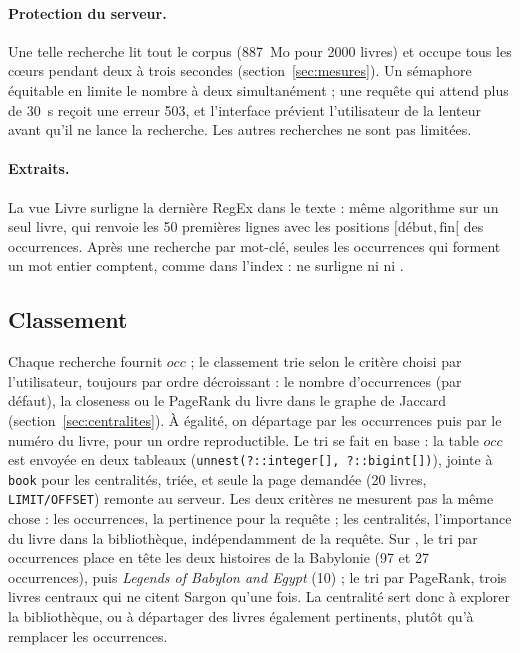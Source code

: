 \paragraph{Protection du serveur.} Une telle recherche lit tout le corpus
(887~Mo pour 2000 livres) et occupe tous les cœurs pendant deux à trois
secondes (section~\ref{sec:mesures}). Un sémaphore équitable en limite le
nombre à deux simultanément ; une requête qui attend plus de 30~s reçoit une
erreur 503, et l'interface prévient l'utilisateur de la lenteur avant qu'il ne
lance la recherche. Les autres recherches ne sont pas limitées.

\paragraph{Extraits.} La vue Livre surligne la dernière RegEx dans le texte :
même algorithme sur un seul livre, qui renvoie les 50 premières lignes avec les
positions $[\text{début}, \text{fin}[$ des occurrences. Après une recherche par
mot-clé, seules les occurrences qui forment un mot entier comptent, comme dans
l'index :  ne surligne ni  ni .

\subsection{Classement}
\label{sec:classement}

Chaque recherche fournit $\mathit{occ}$ ; le classement trie selon le critère
choisi par l'utilisateur, toujours par ordre décroissant : le nombre
d'occurrences (par défaut), la closeness ou le PageRank du livre dans le graphe
de Jaccard (section~\ref{sec:centralites}). À égalité, on départage par les
occurrences puis par le numéro du livre, pour un ordre reproductible. Le tri se
fait en base : la table $\mathit{occ}$ est envoyée en deux tableaux
(\texttt{unnest(?::integer[], ?::bigint[])}), jointe à \texttt{book} pour les
centralités, triée, et seule la page demandée (20 livres, \texttt{LIMIT/OFFSET})
remonte au serveur. Les deux critères ne mesurent pas la même chose : les
occurrences, la pertinence pour la requête ; les centralités, l'importance du
livre dans la bibliothèque, indépendamment de la requête. Sur , le
tri par occurrences place en tête les deux histoires de la Babylonie (97 et 27
occurrences), puis \emph{Legends of Babylon and Egypt} (10) ; le tri par
PageRank, trois livres centraux qui ne citent Sargon qu'une fois. La centralité
sert donc à explorer la bibliothèque, ou à départager des livres également
pertinents, plutôt qu'à remplacer les occurrences.

